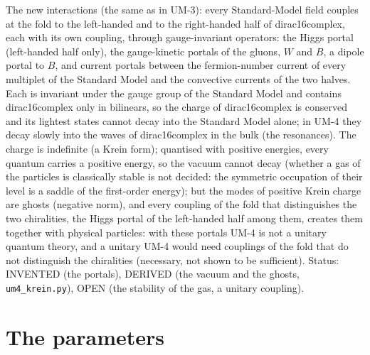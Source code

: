 \documentclass[
  10pt,
]{article}
\begin{document}
The new interactions (the same as in UM-3): every Standard-Model field
couples at the fold to the left-handed and to the right-handed half of
dirac16complex, each with its own coupling, through gauge-invariant
operators: the Higgs portal (left-handed half only), the gauge-kinetic
portals of the gluons, \(W\) and \(B\), a dipole portal to \(B\), and
current portals between the fermion-number current of every multiplet of
the Standard Model and the convective currents of the two halves. Each
is invariant under the gauge group of the Standard Model and contains
dirac16complex only in bilinears, so the charge of dirac16complex is
conserved and its lightest states cannot decay into the Standard Model
alone; in UM-4 they decay slowly into the waves of dirac16complex in the
bulk (the resonances). The charge is indefinite (a Krein form);
quantised with positive energies, every quantum carries a positive
energy, so the vacuum cannot decay (whether a gas of the particles is
classically stable is not decided: the symmetric occupation of their
level is a saddle of the first-order energy); but the modes of positive
Krein charge are ghosts (negative norm), and every coupling of the fold
that distinguishes the two chiralities, the Higgs portal of the
left-handed half among them, creates them together with physical
particles: with these portals UM-4 is not a unitary quantum theory, and
a unitary UM-4 would need couplings of the fold that do not distinguish
the chiralities (necessary, not shown to be sufficient). Status:
INVENTED (the portals), DERIVED (the vacuum and the ghosts,
\texttt{um4\_krein.py}), OPEN (the stability of the gas, a unitary
coupling).

\hypertarget{the-parameters}{%
\section{The parameters}\label{the-parameters}}
\end{document}
